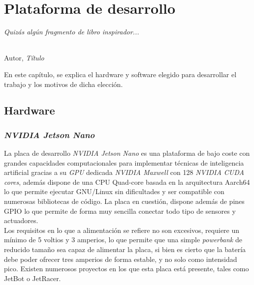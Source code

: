 \chapter{Plataforma de desarrollo}
\label{cap:capitulo3}

\begin{flushright}
\begin{minipage}[]{10cm}
\emph{Quizás algún fragmento de libro inspirador...}\\
\end{minipage}\\

Autor, \textit{Título}\\
\end{flushright}

\vspace{1cm}

En este capítulo, se explica el hardware y software elegido para desarrollar el trabajo y los motivos de dicha elección.

\section{Hardware}
\subsection{\textit{NVIDIA Jetson Nano}}
La placa de desarrollo \textit{NVIDIA Jetson Nano} es una plataforma de bajo coste con grandes capacidades computacionales para implementar técnicas de inteligencia artificial gracias a su \textit{GPU} dedicada \textit{NVIDIA Maxwell} con 128 \textit{NVIDIA CUDA cores}, además dispone de una CPU Quad-core basada en la arquitectura Aarch64 lo que permite ejecutar GNU/Linux sin dificultades y ser compatible con numerosas bibliotecas de código. La placa en cuestión, dispone además de pines GPIO lo que permite de forma muy sencilla conectar todo tipo de sensores y actuadores.\\

Los requisitos en lo que a alimentación se refiere no son excesivos, requiere un mínimo de 5 voltios y 3 amperios, lo que permite que una simple \textit{powerbank} de reducido tamaño sea capaz de alimentar la placa, si bien es cierto que la batería debe poder ofrecer tres amperios de forma estable, y no solo como intensidad pico. Existen numerosos proyectos en los que esta placa está presente, tales como JetBot o JetRacer.\\

